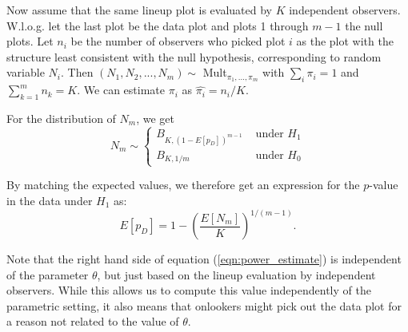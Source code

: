 \documentclass{article}
\newcommand{\blue}[1]{{\color{blue} #1}} %
\newtheorem{dfn}{Definition}[section]
\begin{document}
Now assume that the same lineup plot is evaluated by $K$ independent observers. W.l.o.g. let the last plot be the data plot and plots 1 through $m-1$ the null plots. Let $n_i$ be the number of observers who picked plot $i$ as the plot with the structure least consistent with the null hypothesis, corresponding to random variable $N_i$.  Then  $(N_1, N_2, ..., N_m) \sim$ Mult$_{\pi_1, ..., \pi_m}$ with $\sum_i \pi_i = 1$ and $\sum_{k=1}^{m} n_k = K$. We can estimate $\pi_i$ as $\widehat{\pi_i} = n_i/K$. 

For the distribution of $N_m$, %
we get
\[
N_m\sim \left \{ 
\begin{array}{ll}
B_{K, (1-E[p_D])^{m-1}} & \text { under } H_1\\
B_{K, 1/m} & \text { under } H_0
\end{array}
\right .
\]

By matching the expected values, we therefore get an expression for the $p$-value in the data under $H_1$  as:
\begin{equation}\label{eqn:power_estimate}
{E[p_D]} = 1- \left(\frac{E[N_m]}{K}\right)^{1/(m-1)}.
\end{equation}

\blue{Note that the right hand side of equation (\ref{eqn:power_estimate}) is independent of the parameter $\theta$, but just based on the lineup evaluation by independent observers. While this allows us to compute this value independently of the parametric setting, it also means that onlookers might pick out the data plot for a reason not related to the value of $\theta$. 


%
%
%
}
\end{document}
